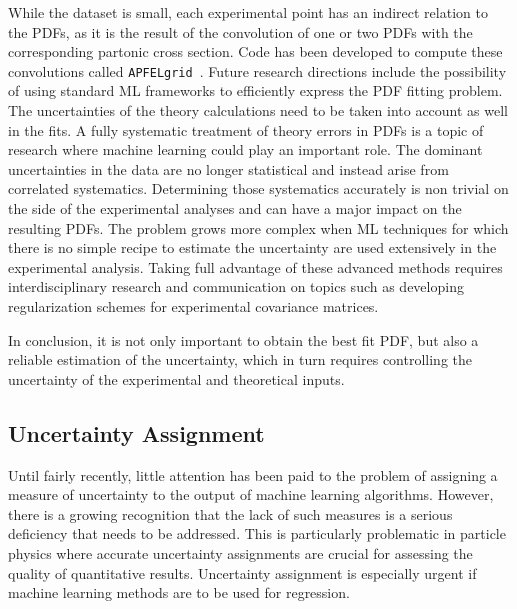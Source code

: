While the dataset is small, each experimental point has an indirect relation to the PDFs, as it is the result of the convolution of one or two PDFs with the corresponding partonic cross section. Code has been developed to compute these convolutions called \texttt{APFELgrid}~\cite{Bertone:2016lga}. Future research directions include the possibility of using standard ML frameworks to efficiently express the PDF fitting problem.
The uncertainties of the theory calculations need to be taken into account as well in the fits. A fully systematic treatment of theory errors in PDFs is a topic of research where machine learning could play an important role.  The dominant uncertainties in the data are no longer statistical and instead arise from correlated systematics. Determining those systematics accurately is non trivial on the side of the experimental analyses and can have a major impact on the
resulting PDFs. The problem grows more complex when ML techniques for which there is no simple recipe to estimate the uncertainty are used extensively in the experimental analysis. Taking full advantage of these advanced methods requires interdisciplinary research and communication on topics such as developing regularization schemes for experimental covariance matrices.

In conclusion, it is not only important to obtain the best fit PDF, but also a reliable estimation of the uncertainty, which in turn requires controlling the uncertainty of the experimental and theoretical inputs.

\subsection{Uncertainty Assignment}\label{sec:uncertainty}
Until fairly recently, little attention has been paid to the problem of assigning a measure of uncertainty to the output of machine learning algorithms. However, there is a growing recognition that the lack of such measures is a serious deficiency that needs to be addressed. This is particularly problematic in particle physics where accurate uncertainty assignments are crucial for assessing the quality of quantitative results. Uncertainty assignment is especially  urgent if machine learning methods are to be used for regression.


